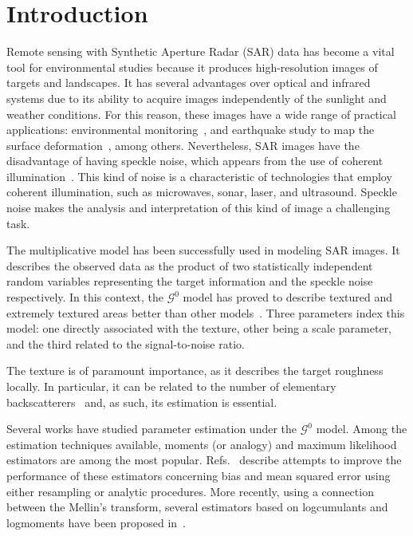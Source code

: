 \documentclass[twocolumn]{svjour3}
\begin{document}
\section{Introduction}
\label{intro}

Remote sensing with Synthetic Aperture Radar (SAR) data has become a vital tool for environmental studies because it produces high-resolution images of targets and landscapes. 
It has several advantages over optical and infrared systems due to its ability to acquire images independently of the sunlight and weather conditions. 
For this reason, these images have a wide range of practical applications: environmental monitoring~\cite{White1991,Brisco2013}, and
earthquake study to map the surface deformation~\cite{Yinghui2017}, among others.  
Nevertheless, SAR images have the disadvantage of having speckle noise, which appears from the use of coherent illumination~\cite{SARImageStatisticalModelingPartISinglePixelStatisticalModels}. 
This kind of noise is a characteristic of technologies that
employ coherent illumination, such as microwaves, sonar, laser, and ultrasound. 
Speckle noise makes the analysis and interpretation of this kind of image a challenging task.

The multiplicative model has been successfully used in modeling SAR images.
It describes the observed data as the product of two statistically independent random variables representing the target information and the speckle noise respectively. 
In this context, the $\mathcal{G}^0$ model has proved to describe textured and extremely textured areas better than other models~\cite{Frery97,MejailJacoboFreryBustos:IJRS}. 
Three parameters index this model: 
one directly associated with the texture, 
other being a scale parameter, 
and the third related to the signal-to-noise ratio.

The texture is of paramount importance, as it describes the target roughness locally.
In particular, it can be related to the number of elementary backscatterers~\cite{AGeneralizedGaussianCoherentScattererModelforCorrelatedSARTexture} and, as such, its estimation is essential.

Several works have studied parameter estimation under the $\mathcal{G}^0$ model. 
Among the estimation techniques available, moments (or analogy) and maximum likelihood estimators are among the most popular. 
Refs.~\cite{VasconcellosFrerySilva:CompStat,CribariFrerySilva:CSDA} describe attempts to improve the performance of these estimators concerning bias and mean squared error using either resampling or analytic procedures. More recently, using a connection between the Mellin's transform, several estimators based on logcumulants and logmoments have been proposed in~\cite{MellinAnalysisPolSAR,BujorTrouveValetNicolas2004,khan2014}. 
\end{document}
